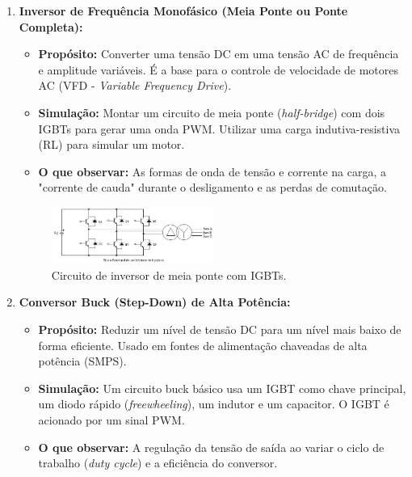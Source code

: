 \documentclass[12pt]{article}
\begin{document}
        \begin{enumerate}
            \item \textbf{Inversor de Frequência Monofásico (Meia Ponte ou Ponte Completa):}
            \begin{itemize}
                \item \textbf{Propósito:} Converter uma tensão DC em uma tensão AC de frequência e amplitude variáveis. É a base para o controle de velocidade de motores AC (VFD - \textit{Variable Frequency Drive}).
                \item \textbf{Simulação:} Montar um circuito de meia ponte (\textit{half-bridge}) com dois IGBTs para gerar uma onda PWM. Utilizar uma carga indutiva-resistiva (RL) para simular um motor.
                \item \textbf{O que observar:} As formas de onda de tensão e corrente na carga, a "corrente de cauda" durante o desligamento e as perdas de comutação.
            \end{itemize}

            \begin{figure}[!h]
                \centering
                \includegraphics[width=0.5\textwidth]{./images/inversorigbt.jpg}
                \caption{Circuito de inversor de meia ponte com IGBTs.}
            \end{figure}

            \item \textbf{Conversor Buck (Step-Down) de Alta Potência:}
            \begin{itemize}
                \item \textbf{Propósito:} Reduzir um nível de tensão DC para um nível mais baixo de forma eficiente. Usado em fontes de alimentação chaveadas de alta potência (SMPS).
                \item \textbf{Simulação:} Um circuito buck básico usa um IGBT como chave principal, um diodo rápido (\textit{freewheeling}), um indutor e um capacitor. O IGBT é acionado por um sinal PWM.
                \item \textbf{O que observar:} A regulação da tensão de saída ao variar o ciclo de trabalho (\textit{duty cycle}) e a eficiência do conversor.
            \end{itemize}


\end{enumerate}
\end{document}
